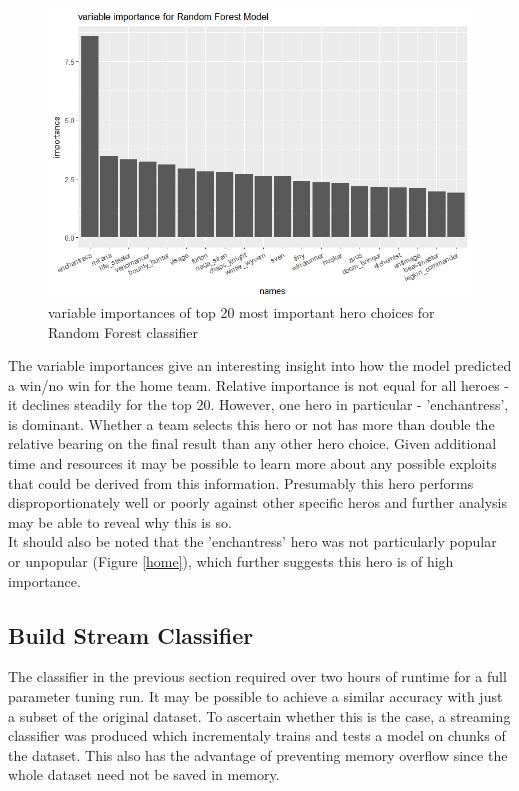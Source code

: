 \documentclass[10pt]{article}
\begin{document}
\begin{figure}[H]
\begin{center}
\includegraphics{vis}
\caption {variable importances of top 20 most important hero choices for Random Forest classifier}
\label{fig002}
\end {center}
\end {figure}

The variable importances give an interesting insight into how the model predicted a win/no win for the home team. Relative importance is not equal for all heroes - it declines steadily for the top 20. However, one hero in particular - 'enchantress', is dominant. Whether a team selects this hero or not has more than double the relative bearing on the final result than any other hero choice. Given additional time and resources it may be possible to learn more about any possible exploits that could be derived from this information. Presumably this hero performs disproportionately well or poorly against other specific heros and further analysis may be able to reveal why this is so.\\

It should also be noted that the 'enchantress' hero was not particularly popular or unpopular (Figure \ref{home}), which further suggests this hero is of high importance.


  

\subsection{Build Stream Classifier}

The classifier in the previous section required over two hours of runtime for a full parameter tuning run. It may be possible to achieve a similar accuracy with just a subset of the original dataset. To ascertain whether this is the case, a streaming classifier was produced which incrementaly trains and tests a model on chunks of the dataset. This also has the advantage of preventing memory overflow since the whole dataset need not be saved in memory.
\end{document}
